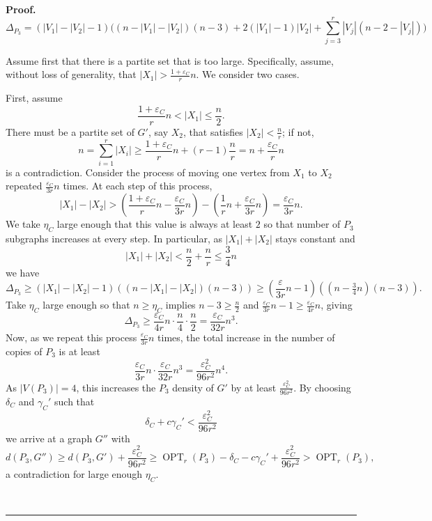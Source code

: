 \documentclass[12pt]{article}
\DeclareMathOperator{\OPT}{OPT}
\renewenvironment{proof}[1][Proof]{\textbf{#1.} }{\ \rule{0.5em}{0.5em}}
\begin{document}
\begin{proof}
\[ \Delta_{P_3} = (|V_1|-|V_2|-1)\bigl((n-|V_1|-|V_2|)(n-3) + 2(|V_1|-1)|V_2|+
\sum_{j=3}^r |V_j|(n-2-|V_j|)\bigr) \]

Assume first that there is a partite set that is too large. Specifically,
assume, without loss of generality, that $|X_1| > \frac{1+\varepsilon_C}{r}n$. We
consider two cases.

First, assume
\[ \frac{1+\varepsilon_C}{r}n < |X_1| \le \frac{n}{2}. \]
There must be a partite set of $G'$, say $X_2$, that satisfies $|X_2| <
\frac{n}{r}$; if not,
\[ n = \sum_{i=1}^r |X_i| \ge \frac{1+\varepsilon_C}{r}n + (r-1)\frac{n}{r} = n +
\frac{\varepsilon_C}{r}n \]
is a contradiction. Consider the process of moving one vertex from
$X_1$ to $X_2$ repeated $\frac{\varepsilon_C}{3r}n$ times. At each step of this
process,
\[ |X_1| - |X_2| > \left(\frac{1+\varepsilon_C}{r}n -
\frac{\varepsilon_C}{3r}n\right) - \left(\frac{1}{r}n +
\frac{\varepsilon_C}{3r}n\right) = \frac{\varepsilon_C}{3r} n. \]
We take $\eta_C$ large enough that this value is always at least $2$ so that
number of $P_3$ subgraphs increases at every step. In
particular, as $|X_1|+|X_2|$ stays constant and
\[ |X_1|+|X_2| < \frac{n}{2} + \frac{n}{r} \le \frac{3}{4}n \]
we have
\[ \Delta_{P_3} \ge (|X_1|-|X_2|-1)((n-|X_1|-|X_2|)(n-3)) \ge
\left(\frac{\varepsilon}{3r}n-1\right)\left((n-\tfrac{3}{4}n)(n-3)\right). \]
Take $\eta_C$ large enough so that $n \ge \eta_C$ implies $n-3 \ge \frac{n}{2}$
and $\frac{\varepsilon_C}{3r}n-1 \ge \frac{\varepsilon_C}{4r}n$, giving
\[ \Delta_{P_3} \ge \frac{\varepsilon_C}{4r}n \cdot \frac{n}{4} \cdot \frac{n}{2}
= \frac{\varepsilon_C}{32r}n^3. \]
Now, as we repeat this process $\frac{\varepsilon_C}{3r} n$ times, the total
increase in the number of copies of $P_3$ is at least
\[ \frac{\varepsilon_C}{3r}n \cdot \frac{\varepsilon_C}{32r}n^3 =
\frac{\varepsilon_C^2}{96r^2}n^4. \]
As $|V(P_3)| = 4$, this increases the $P_3$ density of $G'$ by at least
$\frac{\varepsilon_C^2}{96r^2}$. By choosing $\delta_C$ and $\gamma_C'$ such
that
\[ \delta_C + c\gamma_C' < \frac{\varepsilon_C^2}{96r^2} \]
we arrive at a graph $G''$ with
\[ d(P_3,G'') \ge d(P_3,G') + \frac{\varepsilon_C^2}{96r^2} \ge \OPT_r(P_3)
-\delta_C -c\gamma_C' +\frac{\varepsilon_C^2}{96r^2} > \OPT_r(P_3),\]
a contradiction for large enough $\eta_C$.


\end{proof}
\end{document}

